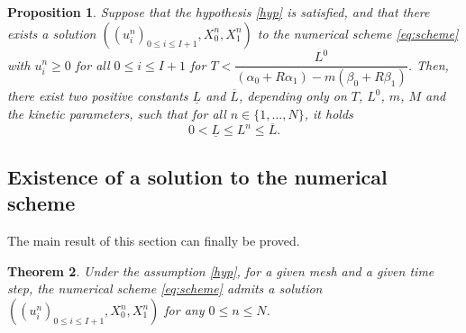 \documentclass{amsart}
\newtheorem{theorem}{Theorem}[section]
\newtheorem{proposition}[theorem]{Proposition}
\begin{document}
	\begin{proposition} \label{prop:Ln_bd}
		Suppose that the hypothesis \eqref{hyp} is satisfied, and that there exists a solution $((u_i^n)_{0 \leq i \leq I+1}, X_0^n, X_1^n)$ to the numerical scheme \eqref{eq:scheme}  with  $u_i^n\geq 0 $ for all $0\leq i\leq I+1$ for $T < \dfrac{L^0}{(\alpha_0 + R \alpha_1) - m(\beta_0 + R \beta_1) }$. Then, there exist two positive constants $\underline{L}$ and $\overline{L}$, depending only on $T$, $L^0$, $m$, $M$ and the kinetic parameters, such that for all $n \in \{1,\dots, N\}$, it holds
		\begin{equation} \label{eq:unif_bds_Ln}
			0 < \underline{L} \leq L^n \leq \overline{L}.
		\end{equation}
	\end{proposition}

	\subsection{Existence of a solution to the numerical scheme} \label{sec:exist_scheme}
	The main result of this section can finally be proved.
		\begin{theorem} \label{th:exist_scheme}
			Under the assumption \eqref{hyp}, for a given mesh and a given time step, the numerical scheme \eqref{eq:scheme} admits a solution $((u_i^n)_{0 \leq i \leq I+1}, X_0^n, X_1^n)$ for any $0 \leq n \leq N$.
		\end{theorem}
\end{document}
